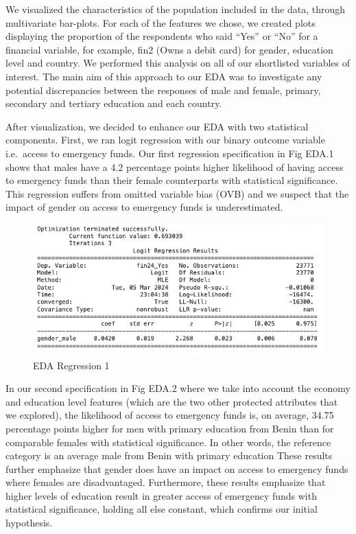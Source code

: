 \documentclass[12pt]{article}
\begin{document}
We visualized the characteristics of the population included in the
data, through multivariate bar-plots. For each of the features we chose,
we created plots displaying the proportion of the respondents who said
``Yes'' or ``No'' for a financial variable, for example, fin2 (Owns a
debit card) for gender, education level and country. We performed this
analysis on all of our shortlisted variables of interest. The main aim
of this approach to our EDA was to investigate any potential
discrepancies between the responses of male and female, primary,
secondary and tertiary education and each country.

After visualization, we decided to enhance our EDA with two statistical
components. First, we ran logit regression with our binary outcome
variable i.e.~access to emergency funds. Our first regression
specification in Fig EDA.1 shows that males have a 4.2 percentage points
higher likelihood of having access to emergency funds than their female
counterparts with statistical significance. This regression suffers from
omitted variable bias (OVB) and we suspect that the impact of gender on
access to emergency funds is underestimated.

\begin{figure}

{\centering \includegraphics[width=1\linewidth]{graphs/eda1} 

}

\caption{EDA Regression 1}\label{fig:unnamed-chunk-14}
\end{figure}

In our second specification in Fig EDA.2 where we take into account the
economy and education level features (which are the two other protected
attributes that we explored), the likelihood of access to emergency
funds is, on average, 34.75 percentage points higher for men with
primary education from Benin than for comparable females with
statistical significance. In other words, the reference category is an
average male from Benin with primary education These results further
emphasize that gender does have an impact on access to emergency funds
where females are disadvantaged. Furthermore, these results emphasize
that higher levels of education result in greater access of emergency
funds with statistical significance, holding all else constant, which
confirms our initial hypothesis.
\end{document}
